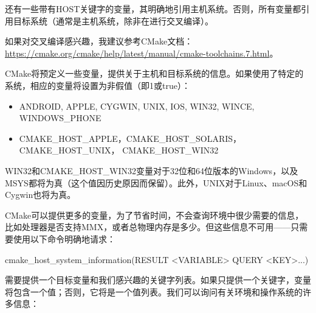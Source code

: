 还有一些带有HOST关键字的变量，其明确地引用主机系统。否则，所有变量都引用目标系统（通常是主机系统，除非在进行交叉编译）。

如果对交叉编译感兴趣，我建议参考CMake文档：\url{https://cmake.org/cmake/help/latest/manual/cmake-toolchains.7.html}。


CMake将预定义一些变量，提供关于主机和目标系统的信息。如果使用了特定的系统，相应的变量将设置为非假值（即1或true）：

\begin{itemize}
\item
ANDROID, APPLE, CYGWIN, UNIX, IOS, WIN32, WINCE, WINDOWS\_PHONE

\item
CMAKE\_HOST\_APPLE，CMAKE\_HOST\_SOLARIS，CMAKE\_HOST\_UNIX， CMAKE\_HOST\_WIN32
\end{itemize}

WIN32和CMAKE\_HOST\_WIN32变量对于32位和64位版本的Windows，以及MSYS都将为真（这个值因历史原因而保留）。此外，UNIX对于Linux、macOS和Cygwin也将为真。


CMake可以提供更多的变量，为了节省时间，不会查询环境中很少需要的信息，比如处理器是否支持MMX，或者总物理内存是多少。但这些信息不可用——只需要使用以下命令明确地请求：

\begin{shell}
cmake_host_system_information(RESULT <VARIABLE> QUERY <KEY>...)
\end{shell}

需要提供一个目标变量和我们感兴趣的关键字列表。如果只提供一个关键字，变量将包含一个值；否则，它将是一个值列表。我们可以询问有关环境和操作系统的许多信息：

